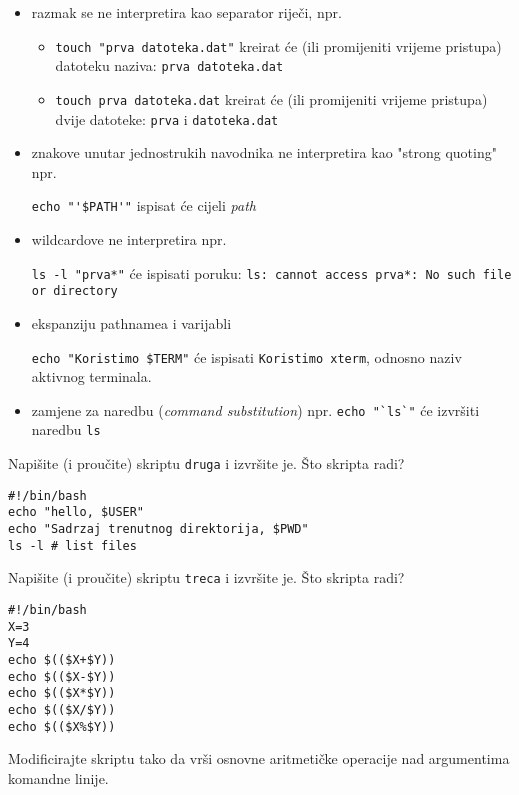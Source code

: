 \begin{itemize}
\item razmak se ne interpretira kao separator riječi, npr.
 
\begin{itemize}
\item  \texttt{touch "prva datoteka.dat"} kreirat će (ili promijeniti vrijeme pristupa) datoteku naziva: \texttt{prva datoteka.dat}

\item \texttt{touch prva datoteka.dat} kreirat će (ili promijeniti vrijeme pristupa) dvije datoteke: \texttt{prva} i \texttt{datoteka.dat}
\end{itemize}

\item znakove unutar jednostrukih navodnika ne interpretira kao "strong quoting" npr.
 
\lstinline!echo "'$PATH'"! ispisat će cijeli \textit{path} 
\item wildcardove ne interpretira npr.
 
\lstinline!ls -l "prva*"! će ispisati poruku: \texttt{ls: cannot access prva*: No such file or directory}
 \item ekspanziju pathnamea i varijabli
 
\lstinline!echo "Koristimo $TERM"! će ispisati \texttt{Koristimo xterm}, odnosno naziv aktivnog terminala.

\item zamjene za naredbu (\textit{command substitution}) npr. 
\lstinline!echo "`ls`"! će izvršiti naredbu \texttt{ls} 
\end{itemize}

\begin{zadatak}
Napišite (i proučite) skriptu \texttt{druga} i izvršite je. Što skripta radi?
\begin{lstlisting}
#!/bin/bash
echo "hello, $USER"
echo "Sadrzaj trenutnog direktorija, $PWD"
ls -l # list files
\end{lstlisting}
\end{zadatak}


\begin{zadatak}
 Napišite (i proučite) skriptu \texttt{treca} i izvršite je. Što skripta radi?
\begin{lstlisting}
#!/bin/bash
X=3
Y=4
echo $(($X+$Y))
echo $(($X-$Y))
echo $(($X*$Y))
echo $(($X/$Y))
echo $(($X%$Y))

\end{lstlisting}
\end{zadatak}

\begin{zadatak}
Modificirajte skriptu tako da vrši osnovne aritmetičke operacije nad argumentima komandne linije.
\end{zadatak}
